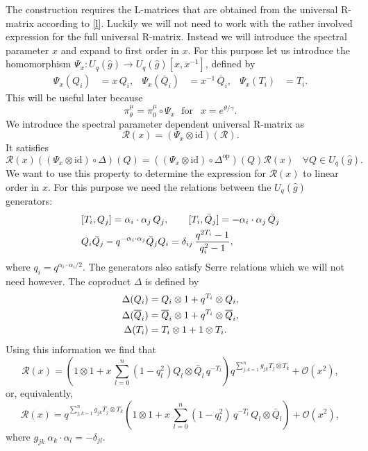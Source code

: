 \documentclass[a4paper,12pt]{article}
\newcommand{\hb}{\hat{\beta}}
\newcommand{\uqgh}{U_q(\hat{g})}
\newcommand{\id}{\text{id}}
\newcommand{\Qb}{\overline{Q}}
\newcommand{\ab}{\alpha}
\newcommand{\ur}{{\mathcal R}}
\numberwithin{equation}{section}
\begin{document}
The construction requires the L-matrices that are obtained from
the universal R-matrix according to \eqref{l}. Luckily we will not
need to work with the rather involved expression for the full
universal R-matrix. Instead we will introduce the spectral
parameter $x$ and expand to first order in $x$. For this purpose
let us introduce the homomorphism
$\Psi_x:\uqgh\rightarrow\uqgh[x,x^{-1}]$, defined by
\begin{align}
  \Psi_x(Q_i)&=x\,Q_i,&\Psi_x(\bar{Q}_i)&=x^{-1}\,\bar{Q}_i,&
  \Psi_x(T_i)&=T_i.
\end{align}
This will be useful later because
\begin{equation}
  \pi^\mu_\theta=\pi^\mu_0\circ\Psi_x~~~\text{for
  }~~x=e^{\theta/\gamma}.
\end{equation}
We introduce the spectral parameter dependent universal R-matrix
as
\begin{equation}
  \ur(x)=(\Psi_x\otimes\id)(\ur).
\end{equation}
It satisfies
\begin{equation}\label{urp}
  \ur(x)\left((\Psi_x\otimes\id)\circ\Delta\right)(Q)=
  \left((\Psi_x\otimes\id)\circ\Delta^{\text{op}}\right)(Q)
  \ur(x)~~~~\forall Q\in\uqgh.
\end{equation}
We want to use this property to determine the expression for
$\ur(x)$ to linear order in $x$. For this purpose we need the
relations between the $\uqgh$ generators:
\begin{align}
  &[T_i,Q_j]=\ab_i\cdot\ab_j\,Q_j,~~~~~~
  [T_i,\bar{Q}_j]=-\ab_i\cdot\ab_j\,\bar{Q}_j\notag\\
  &Q_i\bar{Q}_j-q^{-\alpha_i\cdot\alpha_j}\bar{Q}_j
  Q_i=\delta_{ij}\,\frac{q^{2 T_i}-1}{q_i^{2}-1},\label{qc}
\end{align}
where $q_i=q^{\ab_i\cdot\ab_i/2}$. The generators also satisfy
Serre relations which we will not need however. The coproduct
$\Delta$ is defined by
\begin{align}\label{delta}
  \Delta(Q_i)&=Q_i\otimes 1+q^{T_i}\otimes Q_i,\notag\\
  \Delta(\Qb_i)&=\Qb_i\otimes 1+q^{T_i}\otimes \Qb_i,\\
  \Delta(T_i)&=T_i\otimes 1+1\otimes T_i.\notag
\end{align}
Using this information we find that
\begin{equation}
  \ur(x)=\left(1\otimes 1+x\,\sum_{l=0}^n(1-q_l^2)Q_l\otimes\bar{Q}_l
  \,q^{-T_l}\right)
  q^{\sum_{j,k=1}^n g_{jk}T_j\otimes T_k}+\mathcal{O}(x^2),
\end{equation}
or, equivalently,
\begin{equation}
  \ur(x)=q^{\sum_{j,k=1}^n g_{jk}T_j\otimes T_k}
  \left(1\otimes 1+x\,\sum_{l=0}^n(1-q_l^2)\,q^{-T_l}\,Q_l
  \otimes\bar{Q}_l\right)
  +\mathcal{O}(x^2),
\end{equation}
where $g_{jk}\ \alpha_k\cdot\alpha_l=-\delta_{jl}$.
\end{document}
